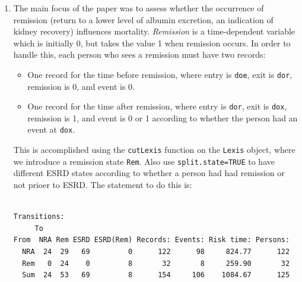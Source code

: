 \documentclass[
]{book}
\newenvironment{Shaded}{\begin{snugshade}}{\end{snugshade}}
\newcommand{\AttributeTok}[1]{\textcolor[rgb]{0.13,0.29,0.53}{#1}}
\newcommand{\CommentTok}[1]{\textcolor[rgb]{0.56,0.35,0.01}{\textit{#1}}}
\newcommand{\ConstantTok}[1]{\textcolor[rgb]{0.56,0.35,0.01}{#1}}
\newcommand{\FunctionTok}[1]{\textcolor[rgb]{0.13,0.29,0.53}{\textbf{#1}}}
\newcommand{\NormalTok}[1]{#1}
\newcommand{\OtherTok}[1]{\textcolor[rgb]{0.56,0.35,0.01}{#1}}
\newcommand{\SpecialCharTok}[1]{\textcolor[rgb]{0.81,0.36,0.00}{\textbf{#1}}}
\newcommand{\StringTok}[1]{\textcolor[rgb]{0.31,0.60,0.02}{#1}}
\providecommand{\tightlist}{%
  \setlength{\itemsep}{0pt}\setlength{\parskip}{0pt}}
\begin{document}
\begin{enumerate}
  What is the hazard ratio between males and females?
  Between two persons who differ 10 years in age at entry?
\item
  The main focus of the paper was to assess whether the occurrence of
  remission (return to a lower level of albumin excretion, an
  indication of kidney recovery) influences mortality.
  \emph{Remission} is a time-dependent variable which is initially 0, but
  takes the value 1 when remission occurs. In order to handle this, each
  person who sees a remission must have two records:

  \begin{itemize}
  \tightlist
  \item
    One record for the time before remission, where entry is
    \texttt{doe}, exit is \texttt{dor}, remission is 0, and event is 0.
  \item
    One record for the time after remission, where entry is
    \texttt{dor}, exit is \texttt{dox}, remission is 1, and event is 0
    or 1 according to whether the person had an event at \texttt{dox}.
  \end{itemize}

  This is accomplished using the \texttt{cutLexis} function on the
  \texttt{Lexis} object, where we introduce a remission state \texttt{Rem}.
  Also use \texttt{split.state=TRUE} to
  have different ESRD states according to whether a person had had
  remission or not prioer to ESRD. The statement to do this is:

\begin{Shaded}
\end{Shaded}

\begin{verbatim}

Transitions:
     To
From  NRA Rem ESRD ESRD(Rem) Records: Events: Risk time: Persons:
  NRA  24  29   69         0      122      98     824.77      122
  Rem   0  24    0         8       32       8     259.90       32
  Sum  24  53   69         8      154     106    1084.67      125
\end{verbatim}


\end{enumerate}
\end{document}
